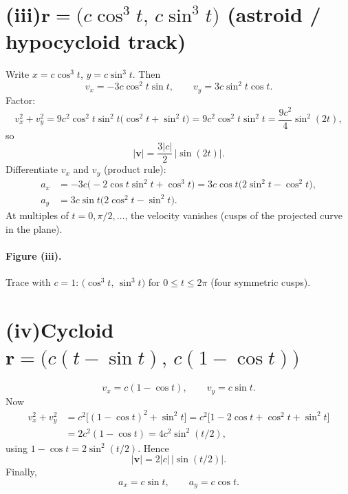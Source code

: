 \documentclass[11pt]{article}
\begin{document}
\section*{(iii)\quad \(\mathbf{r}=\bigl(c\cos^3 t,\,c\sin^3 t\bigr)\) (astroid / hypocycloid track)}
Write \(x=c\cos^3 t\), \(y=c\sin^3 t\). Then
\[
v_x=-3c\cos^2 t\sin t,\qquad v_y=3c\sin^2 t\cos t.
\]
Factor:
\[
v_x^2+v_y^2
=9c^2\cos^2 t\sin^2 t\bigl(\cos^2 t+\sin^2 t\bigr)
=9c^2\cos^2 t\sin^2 t
=\frac{9c^2}{4}\sin^2(2t),
\]
so
\[
|\mathbf{v}|=\frac{3|c|}{2}\,|\sin(2t)|.
\]
Differentiate \(v_x\) and \(v_y\) (product rule):
\begin{align*}
a_x &= -3c\bigl(-2\cos t\sin^2 t+\cos^3 t\bigr)
=3c\cos t\bigl(2\sin^2 t-\cos^2 t\bigr),\\
a_y &= 3c\sin t\bigl(2\cos^2 t-\sin^2 t\bigr).
\end{align*}
At multiples of \(t=0,\pi/2,\ldots\), the velocity vanishes (cusps of the projected
curve in the plane).

\paragraph{Figure (iii).}
Trace with \(c=1\): \(\bigl(\cos^3 t,\,\sin^3 t\bigr)\) for \(0\le t\le 2\pi\) (four symmetric cusps).

\begin{center}
\end{center}

\section*{(iv)\quad Cycloid \(\mathbf{r}=\bigl(c(t-\sin t),\,c(1-\cos t)\bigr)\)}
\[
v_x=c(1-\cos t),\qquad v_y=c\sin t.
\]
Now
\begin{align*}
v_x^2+v_y^2
&=c^2\bigl[(1-\cos t)^2+\sin^2 t\bigr]
=c^2\bigl[1-2\cos t+\cos^2 t+\sin^2 t\bigr]\\
&=2c^2(1-\cos t)=4c^2\sin^2(t/2),
\end{align*}
using \(1-\cos t=2\sin^2(t/2)\). Hence
\[
|\mathbf{v}|=2|c|\,|\sin(t/2)|.
\]
Finally,
\[
a_x=c\sin t,\qquad a_y=c\cos t.
\]
\end{document}
